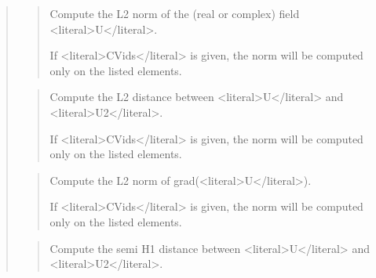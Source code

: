 \documentclass[a4paper,11pt,english]{sphinxmanual}
\begin{document}
\sphinxAtStartPar
{}
\begin{quote}

\sphinxAtStartPar
{}
\begin{quote}

\sphinxAtStartPar
Compute the L2 norm of the (real or complex) field \textless{}literal\textgreater{}U\textless{}/literal\textgreater{}.

\sphinxAtStartPar
If \textless{}literal\textgreater{}CVids\textless{}/literal\textgreater{} is given, the norm will be computed only on the listed
elements.
\end{quote}

\sphinxAtStartPar
{}
\begin{quote}

\sphinxAtStartPar
Compute the L2 distance between \textless{}literal\textgreater{}U\textless{}/literal\textgreater{} and \textless{}literal\textgreater{}U2\textless{}/literal\textgreater{}.

\sphinxAtStartPar
If \textless{}literal\textgreater{}CVids\textless{}/literal\textgreater{} is given, the norm will be computed only on the listed
elements.
\end{quote}

\sphinxAtStartPar
{}
\begin{quote}

\sphinxAtStartPar
Compute the L2 norm of grad(\textless{}literal\textgreater{}U\textless{}/literal\textgreater{}).

\sphinxAtStartPar
If \textless{}literal\textgreater{}CVids\textless{}/literal\textgreater{} is given, the norm will be computed only on the listed
elements.
\end{quote}

\sphinxAtStartPar
{}
\begin{quote}

\sphinxAtStartPar
Compute the semi H1 distance between \textless{}literal\textgreater{}U\textless{}/literal\textgreater{} and \textless{}literal\textgreater{}U2\textless{}/literal\textgreater{}.


\end{quote}
\end{quote}
\end{document}
